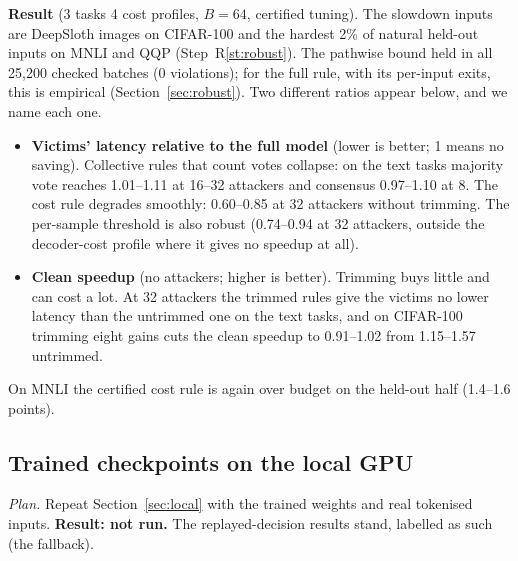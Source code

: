 \textbf{Result} (3 tasks \x{} 4 cost profiles, $B=64$, certified tuning). The slowdown inputs are DeepSloth images
on CIFAR-100 and the hardest 2\% of natural held-out inputs on MNLI and QQP (Step~R\ref{st:robust}). The pathwise
bound held in all 25{,}200 checked batches (0 violations); for the full rule, with its per-input exits, this is
empirical (Section~\ref{sec:robust}). Two different ratios appear below, and we name each one.
\begin{itemize}
  \item \textbf{Victims' latency relative to the full model} (lower is better; 1\x{} means no saving). Collective rules
  that count votes collapse: on the text tasks majority vote reaches 1.01--1.11\x{} at 16--32 attackers and consensus
  0.97--1.10\x{} at 8. The cost rule degrades smoothly: 0.60--0.85\x{} at 32 attackers without trimming. The
  per-sample threshold is also robust (0.74--0.94\x{} at 32 attackers, outside the decoder-cost profile where it gives
  no speedup at all).
  \item \textbf{Clean speedup} (no attackers; higher is better). Trimming buys little and can cost a lot. At 32
  attackers the trimmed rules give the victims no lower latency than the untrimmed one on the text tasks, and on
  CIFAR-100 trimming eight gains cuts the clean speedup to 0.91--1.02\x{} from 1.15--1.57\x{} untrimmed.
\end{itemize}
On MNLI the certified cost rule is again over budget on the held-out half (1.4--1.6 points).

\subsection{Trained checkpoints on the local GPU}
\textit{Plan.} Repeat Section~\ref{sec:local} with the trained weights and real tokenised inputs. \textbf{Result:
not run.} The replayed-decision results stand, labelled as such (the fallback).

